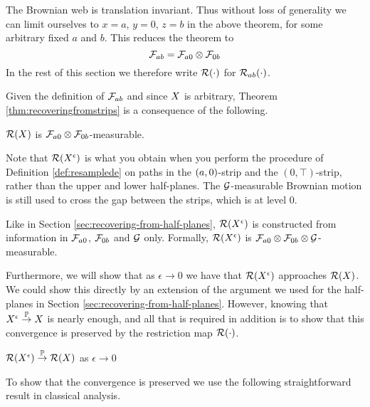 {The Brownian web is translation invariant.  Thus without loss of
generality we can limit ourselves to $x=a$, $y=0$, $z=b$ in the above
theorem, for some arbitrary fixed $a$ and $b$.  This reduces the theorem to
\[
\mathcal{F}_{a b} = \mathcal{F}_{a 0} \otimes \mathcal{F}_{0 b}
\]
In the rest of this
section we therefore write $\mathcal{R}(\cdot)$ for
$\mathcal{R}_{{a}{b}}(\cdot)$.

Given the definition of $\mathcal{F}_{a b}$ and since $X$ is
arbitrary, Theorem \ref{thm:recoveringfromstrips} is a consequence of
the following.
\begin{lemma}
  $\mathcal{R}(X)$ is $\mathcal{F}_{a 0} \otimes
  \mathcal{F}_{0 b}$-measurable.
\end{lemma}

\newcommand{\Resresamplede}{\Res{\resamplede}}
\newcommand{\Ressampled}{\Res{\sampled}}

Note that $\Resresamplede$ is what you obtain when you perform the
procedure of Definition \ref{def:resamplede} on paths in the
$(a,0)$-strip and the $(0,\top)$-strip, rather than the upper and lower
half-planes.  The $\mathcal{G}$-measurable Brownian motion is still used to
cross the gap between the strips, which is at level $0$.

Like in Section \ref{sec:recovering-from-half-planes}, $\Resresamplede$
is constructed from information in $\mathcal{F}_{a 0}$,
$\mathcal{F}_{0 b}$ and $\mathcal{G}$ only.
Formally,
  $\mathcal{R}(X^{\epsilon})$ is $\mathcal{F}_{a 0} \otimes \mathcal{F}_{0 b}
  \otimes \mathcal{G}$-measurable.

Furthermore, we will show that as $\epsilon \to 0$ we have that
$\Resresamplede$ approaches $\Ressampled$.  We could show this
directly by an extension of the argument we used for the half-planes
in Section \ref{sec:recovering-from-half-planes}.  However, knowing that
$X^{\epsilon} \overset{\mathbb{P}}\to X$ is nearly enough, and all that is required
in addition is to show that this convergence is preserved by the
restriction map $\mathcal{R}(\cdot)$.

\begin{lemma}
    \label{lem:resamplede-to-sampled-strip}
    $\mathcal{R}(X^{\epsilon}) \overset{\mathbb{P}}\to \mathcal{R}(X)$ as $\epsilon \to 0$
\end{lemma}

To show that the convergence is preserved we use the following
straightforward result in classical analysis.

}
